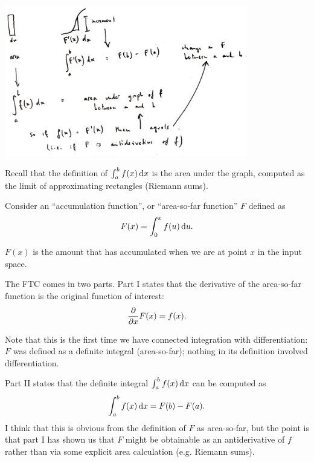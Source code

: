 \includegraphics[width=300pt]{img/ftc.png}

Recall that the definition of $\int_a^b f(x) \dx$ is the area under the graph,
computed as the limit of approximating rectangles (Riemann sums).

Consider an ``accumulation function'', or ``area-so-far function'' $F$ defined
as
\begin{align*}
  F(x) = \int_0^x f(u) \d u.
\end{align*}

$F(x)$ is the amount that has accumulated when we are at point $x$ in the
input space.

The FTC comes in two parts. Part I states that the derivative of the
area-so-far function is the original function of interest:
\begin{align*}
  \frac{\partial}{\partial x} F(x) = f(x).
\end{align*}

Note that this is the first time we have connected integration with
differentiation: $F$ was defined as a definite integral (area-so-far); nothing
in its definition involved differentiation.

Part II states that the definite integral $\int_a^b f(x) \dx$ can be computed as
\begin{align*}
  \int_a^b f(x) \dx = F(b) - F(a).
\end{align*}
I think that this is obvious from the definition of $F$ as area-so-far, but the
point is that part I has shown us that $F$ might be obtainable as an
antiderivative of $f$ rather than via some explicit area calculation
(e.g. Riemann sums).

